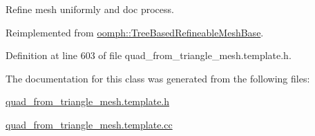 Refine mesh uniformly and doc process. 



Reimplemented from \hyperlink{classoomph_1_1TreeBasedRefineableMeshBase_ae238476195a0ceeb2cdb680620fb97a3}{oomph\+::\+Tree\+Based\+Refineable\+Mesh\+Base}.



Definition at line 603 of file quad\+\_\+from\+\_\+triangle\+\_\+mesh.\+template.\+h.



The documentation for this class was generated from the following files\+:\begin{DoxyCompactItemize}
\item 
\hyperlink{quad__from__triangle__mesh_8template_8h}{quad\+\_\+from\+\_\+triangle\+\_\+mesh.\+template.\+h}\item 
\hyperlink{quad__from__triangle__mesh_8template_8cc}{quad\+\_\+from\+\_\+triangle\+\_\+mesh.\+template.\+cc}\end{DoxyCompactItemize}
